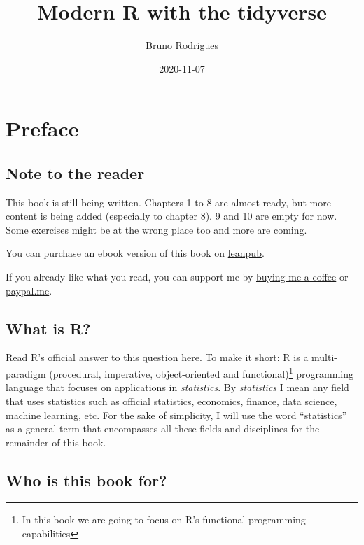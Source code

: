 \documentclass[
]{article}
\title{Modern R with the tidyverse}
\author{Bruno Rodrigues}
\date{2020-11-07}
\begin{document}
\maketitle

{
\setcounter{tocdepth}{2}
\tableofcontents
}
\hypertarget{preface}{%
\section*{Preface}\label{preface}}

\hypertarget{note-to-the-reader}{%
\subsection*{Note to the reader}\label{note-to-the-reader}}

This book is still being written. Chapters 1 to 8 are almost ready, but more content is being added
(especially to chapter 8). 9 and 10 are empty for now. Some exercises might be at the wrong place
too and more are coming.

You can purchase an ebook version of this book on \href{https://leanpub.com/modern_tidyverse}{leanpub}.

If you already like what you read, you can support
me by \href{https://www.buymeacoffee.com/brodriguesco}{buying me a coffee}
or \href{https://www.paypal.me/brodriguesco}{paypal.me}.

\hypertarget{what-is-r}{%
\subsection*{What is R?}\label{what-is-r}}

Read R's official answer to this question
\href{https://cran.r-project.org/doc/FAQ/R-FAQ.html\#What-is-R_003f}{here}. To make it short: R is a
multi-paradigm (procedural, imperative, object-oriented and functional)\footnote{In this book we are going
  to focus on R's functional programming capabilities} programming language that
focuses on applications in \emph{statistics}. By \emph{statistics} I mean any field that uses statistics such
as official statistics, economics, finance, data science, machine learning, etc. For the sake of
simplicity, I will use the word ``statistics'' as a general term that encompasses all these fields and
disciplines for the remainder of this book.

\hypertarget{who-is-this-book-for}{%
\subsection*{Who is this book for?}\label{who-is-this-book-for}}
\end{document}
